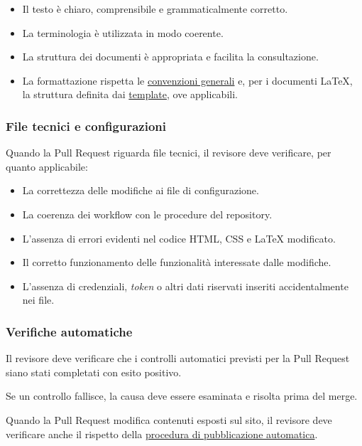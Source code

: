 \documentclass[11pt, a4paper]{article}
\begin{document}
\begin{itemize}
    \item Il testo è chiaro, comprensibile e grammaticalmente corretto.
    \item La terminologia è utilizzata in modo coerente.
    \item La struttura dei documenti è appropriata e facilita la consultazione.
    \item La formattazione rispetta le \hyperref[subsec:formattazione-del-testo]{convenzioni generali} e, per i documenti LaTeX, la struttura definita dai \href{https://github.com/On-By-One-Team/On-By-One.github.io/tree/main/docs/tex/templates}{template}, ove applicabili.
\end{itemize}

\subsubsection{File tecnici e configurazioni}

Quando la Pull Request riguarda file tecnici, il revisore deve verificare, per quanto applicabile:
\begin{itemize}
    \item La correttezza delle modifiche ai file di configurazione.
    \item La coerenza dei workflow con le procedure del repository.
    \item L'assenza di errori evidenti nel codice HTML, CSS e LaTeX modificato.
    \item Il corretto funzionamento delle funzionalità interessate dalle modifiche.
    \item L'assenza di credenziali, \textit{token} o altri dati riservati inseriti accidentalmente nei file.
\end{itemize}

\subsubsection{Verifiche automatiche}

Il revisore deve verificare che i controlli automatici previsti per la Pull Request siano stati completati con esito positivo.

Se un controllo fallisce, la causa deve essere esaminata e risolta prima del merge.

Quando la Pull Request modifica contenuti esposti sul sito, il revisore deve verificare anche il rispetto della \hyperref[sec:pubblicazione-automatica]{procedura di pubblicazione automatica}.
\end{document}
